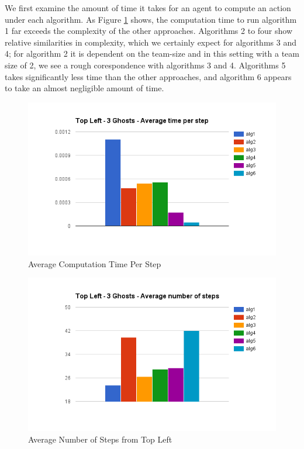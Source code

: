 \documentclass[11pt]{article}
\begin{document}
\begin{multicols}{2}
We first examine the amount of time it takes for an agent to compute an action under each algorithm. As Figure \ref{fig:averagecomputation} shows, the computation time to run algorithm 1 far exceeds the complexity of the other approaches. Algorithms 2 to four show relative similarities in complexity, which we certainly expect for algorithms 3 and 4; for algorithm 2 it is dependent on the team-size and in this setting with a team size of 2, we see a rough corespondence with algorithms 3 and 4. Algorithms 5 takes significantly less time than the other approaches, and algorithm 6 appears to take an almost negligible amount of time. 
\begin{figure}[H]
	\includegraphics[scale=0.45]{time.png}
	\caption{Average Computation Time Per Step}
	\label{fig:averagecomputation}
\end{figure}	
\begin{figure}[H]
	\includegraphics[scale=0.45]{leftsteps.png}
	\caption{Average Number of Steps from Top Left}
	\label{fig:averagenumstepsleft}
\end{figure}


\end{multicols}
\end{document}
